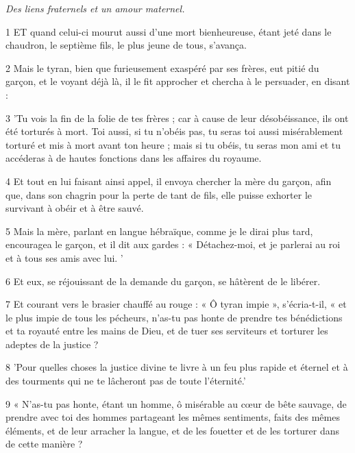 \par \textit{Des liens fraternels et un amour maternel.}

\par 1 ET quand celui-ci mourut aussi d'une mort bienheureuse, étant jeté dans le chaudron, le septième fils, le plus jeune de tous, s'avança.

\par 2 Mais le tyran, bien que furieusement exaspéré par ses frères, eut pitié du garçon, et le voyant déjà là, il le fit approcher et chercha à le persuader, en disant :

\par 3 'Tu vois la fin de la folie de tes frères ; car à cause de leur désobéissance, ils ont été torturés à mort. Toi aussi, si tu n'obéis pas, tu seras toi aussi misérablement torturé et mis à mort avant ton heure ; mais si tu obéis, tu seras mon ami et tu accéderas à de hautes fonctions dans les affaires du royaume.

\par 4 Et tout en lui faisant ainsi appel, il envoya chercher la mère du garçon, afin que, dans son chagrin pour la perte de tant de fils, elle puisse exhorter le survivant à obéir et à être sauvé.

\par 5 Mais la mère, parlant en langue hébraïque, comme je le dirai plus tard, encouragea le garçon, et il dit aux gardes : « Détachez-moi, et je parlerai au roi et à tous ses amis avec lui. '

\par 6 Et eux, se réjouissant de la demande du garçon, se hâtèrent de le libérer.

\par 7 Et courant vers le brasier chauffé au rouge : « Ô tyran impie », s'écria-t-il, « et le plus impie de tous les pécheurs, n'as-tu pas honte de prendre tes bénédictions et ta royauté entre les mains de Dieu, et de tuer ses serviteurs et torturer les adeptes de la justice ?

\par 8 'Pour quelles choses la justice divine te livre à un feu plus rapide et éternel et à des tourments qui ne te lâcheront pas de toute l'éternité.'

\par 9 « N'as-tu pas honte, étant un homme, ô misérable au cœur de bête sauvage, de prendre avec toi des hommes partageant les mêmes sentiments, faits des mêmes éléments, et de leur arracher la langue, et de les fouetter et de les torturer dans de cette manière ?

